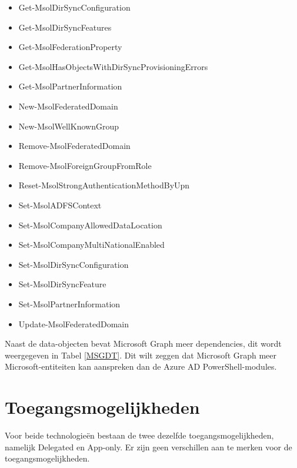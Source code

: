 \begin{itemize}
\begin{itemize}
        \item Get-MsolDirSyncConfiguration
        \item Get-MsolDirSyncFeatures
        \item Get-MsolFederationProperty
        \item Get-MsolHasObjectsWithDirSyncProvisioningErrors
        \item Get-MsolPartnerInformation
        \item New-MsolFederatedDomain
        \item New-MsolWellKnownGroup
        \item Remove-MsolFederatedDomain
        \item Remove-MsolForeignGroupFromRole
        \item Reset-MsolStrongAuthenticationMethodByUpn
        \item Set-MsolADFSContext
        \item Set-MsolCompanyAllowedDataLocation
        \item Set-MsolCompanyMultiNationalEnabled
        \item Set-MsolDirSyncConfiguration
        \item Set-MsolDirSyncFeature
        \item Set-MsolPartnerInformation
        \item Update-MsolFederatedDomain    
    \end{itemize}
\end{itemize}

Naast de data-objecten bevat Microsoft Graph meer dependencies, dit wordt weergegeven in Tabel \ref{MSGDT}. Dit wilt zeggen dat Microsoft Graph meer Microsoft-entiteiten kan aanspreken dan de Azure \ac{AD} PowerShell-modules. 


\section{Toegangsmogelijkheden}



Voor beide technologieën bestaan de twee dezelfde toegangsmogelijkheden, namelijk Delegated en App-only. Er zijn geen verschillen aan te merken voor de toegangsmogelijkheden. \\

